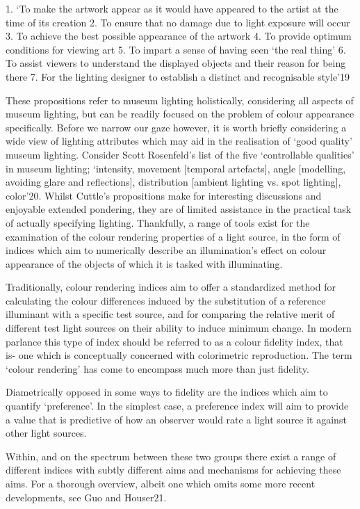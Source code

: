 1.	`To make the artwork appear as it would have appeared to the artist at the time of its creation
2.	To ensure that no damage due to light exposure will occur
3.	To achieve the best possible appearance of the artwork
4.	To provide optimum conditions for viewing art
5.	To impart a sense of having seen `the real thing'
6.	To assist viewers to understand the displayed objects and their reason for being there
7.	For the lighting designer to establish a distinct and recognisable style'19 

These propositions refer to museum lighting holistically, considering all aspects of museum lighting, but can be readily focused on the problem of colour appearance specifically. Before we narrow our gaze however, it is worth briefly considering a wide view of lighting attributes which may aid in the realisation of `good quality' museum lighting. Consider Scott Rosenfeld's list of the five `controllable qualities' in museum lighting; `intensity, movement [temporal artefacts], angle [modelling, avoiding glare and reflections], distribution [ambient lighting vs. spot lighting], color'20.
Whilst Cuttle's propositions make for interesting discussions and enjoyable extended pondering, they are of limited assistance in the practical task of actually specifying lighting. Thankfully, a range of tools exist for the examination of the colour rendering properties of a light source, in the form of indices which aim to numerically describe an illumination's effect on colour appearance of the objects of which it is tasked with illuminating.

Traditionally, colour rendering indices aim to offer a standardized method for calculating the colour differences induced by the substitution of a reference illuminant with a specific test source, and for comparing the relative merit of different test light sources on their ability to induce minimum change. In modern parlance this type of index should be referred to as a colour fidelity index, that is- one which is conceptually concerned with colorimetric reproduction. The term `colour rendering' has come to encompass much more than just fidelity.

Diametrically opposed in some ways to fidelity are the indices which aim to quantify `preference'. In the simplest case, a preference index will aim to provide a value that is predictive of how an observer would rate a light source it against other light sources. 

Within, and on the spectrum between these two groups there exist a range of different indices with subtly different aims and mechanisms for achieving these aims. For a thorough overview, albeit one which omits some more recent developments, see Guo and Houser21.

